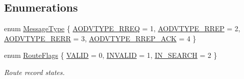 \subsection*{Enumerations}
\begin{DoxyCompactItemize}
\item 
enum \hyperlink{namespacens3_1_1aodv_a8cf417608302ba0ed75225c976944d44}{Message\+Type} \{ \hyperlink{namespacens3_1_1aodv_a8cf417608302ba0ed75225c976944d44ad5f62dc18635d788b1a5b0dd834d46f0}{A\+O\+D\+V\+T\+Y\+P\+E\+\_\+\+R\+R\+EQ} = 1, 
\hyperlink{namespacens3_1_1aodv_a8cf417608302ba0ed75225c976944d44a034af3d66c569436a630b5ee35399e45}{A\+O\+D\+V\+T\+Y\+P\+E\+\_\+\+R\+R\+EP} = 2, 
\hyperlink{namespacens3_1_1aodv_a8cf417608302ba0ed75225c976944d44a363aea0c29a02f5899cf088654c6d844}{A\+O\+D\+V\+T\+Y\+P\+E\+\_\+\+R\+E\+RR} = 3, 
\hyperlink{namespacens3_1_1aodv_a8cf417608302ba0ed75225c976944d44a1bd445a537508666f448cc9f5a16f6a8}{A\+O\+D\+V\+T\+Y\+P\+E\+\_\+\+R\+R\+E\+P\+\_\+\+A\+CK} = 4
 \}
\item 
enum \hyperlink{group__aodv_ga44216921a9c725a5ab8bc19059052a26}{Route\+Flags} \{ \hyperlink{group__aodv_gga44216921a9c725a5ab8bc19059052a26af5fecee96bb2650aa417994840b43c99}{V\+A\+L\+ID} = 0, 
\hyperlink{group__aodv_gga44216921a9c725a5ab8bc19059052a26a0d7b8118b2af9344a91683148f1261c3}{I\+N\+V\+A\+L\+ID} = 1, 
\hyperlink{group__aodv_gga44216921a9c725a5ab8bc19059052a26aba44cda5a5df371b6567f70d7d8311fa}{I\+N\+\_\+\+S\+E\+A\+R\+CH} = 2
 \}\begin{DoxyCompactList}\small\item\em Route record states. \end{DoxyCompactList}
\end{DoxyCompactItemize}
